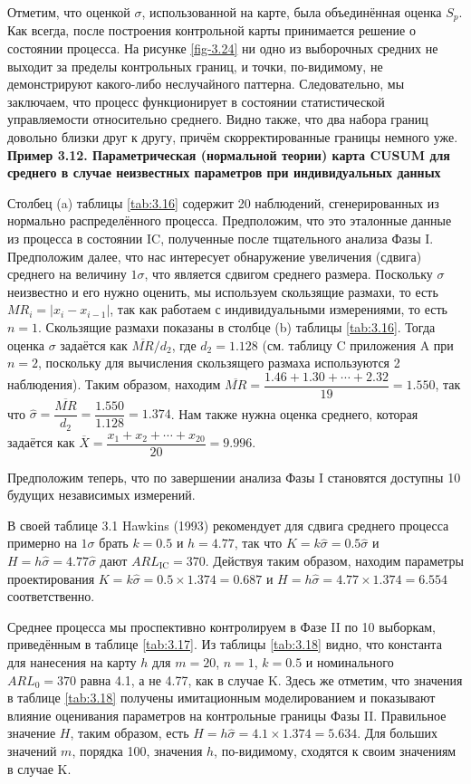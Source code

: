 Отметим, что оценкой \(\sigma\), использованной на карте, была объединённая оценка \(S_p\). Как всегда, после построения контрольной карты принимается решение о состоянии процесса. На рисунке \ref{fig-3.24} ни одно из выборочных средних не выходит за пределы контрольных границ, и точки, по-видимому, не демонстрируют какого-либо неслучайного паттерна. Следовательно, мы заключаем, что процесс функционирует в состоянии статистической управляемости относительно среднего. Видно также, что два набора границ довольно близки друг к другу, причём скорректированные границы немного уже.
\noindent\textbf{Пример 3.12. Параметрическая (нормальной теории) карта CUSUM для среднего в случае неизвестных параметров при индивидуальных данных}

Столбец (a) таблицы \ref{tab:3.16} содержит 20 наблюдений, сгенерированных из нормально распределённого процесса. Предположим, что это эталонные данные из процесса в состоянии IC, полученные после тщательного анализа Фазы I. Предположим далее, что нас интересует обнаружение увеличения (сдвига) среднего на величину \(1\sigma\), что является сдвигом среднего размера. Поскольку \(\sigma\) неизвестно и его нужно оценить, мы используем скользящие размахи, то есть \(MR_i = |x_i - x_{i-1}|\), так как работаем с индивидуальными измерениями, то есть \(n = 1\). Скользящие размахи показаны в столбце (b) таблицы \ref{tab:3.16}. Тогда оценка \(\sigma\) задаётся как \(\overline{MR}/d_2\), где \(d_2 = 1.128\) (см. таблицу C приложения A при \(n = 2\), поскольку для вычисления скользящего размаха используются 2 наблюдения). Таким образом, находим \(\overline{MR} = \dfrac{1.46 + 1.30 + \cdots + 2.32}{19} = 1.550\), так что \(\hat{\sigma} = \dfrac{\overline{MR}}{d_2} = \dfrac{1.550}{1.128} = 1.374\). Нам также нужна оценка среднего, которая задаётся как \(\overline{X} = \dfrac{x_1 + x_2 + \cdots + x_{20}}{20} = 9.996\).

Предположим теперь, что по завершении анализа Фазы I становятся доступны 10 будущих независимых измерений.

В своей таблице 3.1 Hawkins (1993) рекомендует для сдвига среднего процесса примерно на \(1\sigma\) брать \(k = 0.5\) и \(h = 4.77\), так что \(K = k\hat{\sigma} = 0.5\hat{\sigma}\) и \(H = h\hat{\sigma} = 4.77\hat{\sigma}\) дают \(ARL_{\text{IC}} = 370\). Действуя таким образом, находим параметры проектирования \(K = k\hat{\sigma} = 0.5 \times 1.374 = 0.687\) и \(H = h\hat{\sigma} = 4.77 \times 1.374 = 6.554\) соответственно.

Среднее процесса мы проспективно контролируем в Фазе II по 10 выборкам, приведённым в таблице \ref{tab:3.17}. Из таблицы \ref{tab:3.18} видно, что константа для нанесения на карту \(h\) для \(m = 20\), \(n = 1\), \(k = 0.5\) и номинального \(ARL_0 = 370\) равна 4.1, а не 4.77, как в случае K. Здесь же отметим, что значения в таблице \ref{tab:3.18} получены имитационным моделированием и показывают влияние оценивания параметров на контрольные границы Фазы II. Правильное значение \(H\), таким образом, есть \(H = h\hat{\sigma} = 4.1 \times 1.374 = 5.634\). Для больших значений \(m\), порядка 100, значения \(h\), по-видимому, сходятся к своим значениям в случае K.

